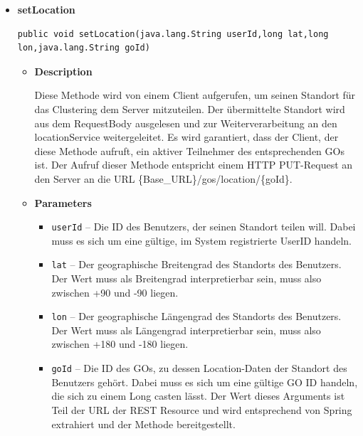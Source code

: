\documentclass[11pt,a4paper]{article}
\begin{document}
{{{{{{{{{{{{{{{{{{{\begin{itemize}
{\begin{itemize}
{}%
\end{itemize}
}%
\item{ 
\hypertarget{edu.kit.pse17.go_app.ClientCommunication.Upstream.GoRestController.setLocation(java.lang.String, long, long, java.lang.String)}{{\bf  setLocation}\\}
\begin{lstlisting}[frame=none]
public void setLocation(java.lang.String userId,long lat,long lon,java.lang.String goId)\end{lstlisting} %
\begin{itemize}
\item{
{\bf  Description}

Diese Methode wird von einem Client aufgerufen, um seinen Standort für das Clustering dem Server mitzuteilen. Der übermittelte Standort wird aus dem RequestBody ausgelesen und zur Weiterverarbeitung an den locationService weitergeleitet. Es wird garantiert, dass der Client, der diese Methode aufruft, ein aktiver Teilnehmer des entsprechenden GOs ist. Der Aufruf dieser Methode entspricht einem HTTP PUT-Request an den Server an die URL \{Base\_URL\}/gos/location/\{goId\}.
}
\item{
{\bf  Parameters}
  \begin{itemize}
   \item{
\texttt{userId} -- Die ID des Benutzers, der seinen Standort teilen will. Dabei muss es sich um eine gültige, im System registrierte UserID handeln.}
   \item{
\texttt{lat} -- Der geographische Breitengrad des Standorts des Benutzers. Der Wert muss als Breitengrad interpretierbar sein, muss also zwischen +90 und -90 liegen.}
   \item{
\texttt{lon} -- Der geographische Längengrad des Standorts des Benutzers. Der Wert muss als Längengrad interpretierbar sein, muss also zwischen +180 und -180 liegen.}
   \item{
\texttt{goId} -- Die ID des GOs, zu dessen Location-Daten der Standort des Benutzers gehört. Dabei muss es sich um eine gültige GO ID handeln, die sich zu einem Long casten lässt. Der Wert dieses Arguments ist Teil der URL der REST Resource und wird entsprechend von Spring extrahiert und der Methode bereitgestellt.}
  \end{itemize}
}%
\end{itemize}
}%
\end{itemize}
}
}
}}}}}}}}}}}}}}}}}
\end{document}
